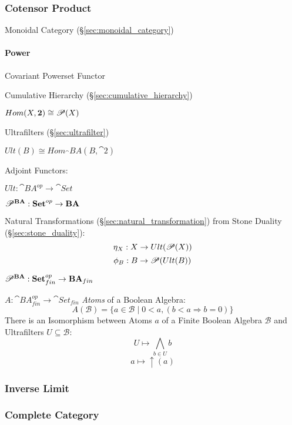 \subsubsection{Cotensor Product}\label{sec:cotensor_product}

Monoidal Category (\S\ref{sec:monoidal_category})



\paragraph{Power}\label{sec:power}

Covariant Powerset Functor %

Cumulative Hierarchy (\S\ref{sec:cumulative_hierarchy})

$Hom(X,\mathbf{2}) \cong \mathscr{P}(X)$

Ultrafilters (\S\ref{sec:ultrafilter})

$Ult(B) \cong Hom_\cat{BA}(B,\cat{2})$

Adjoint Functors:

$Ult : \cat{BA}^{op} \rightarrow \cat{Set}$

$\mathscr{P}^\mathbf{BA} : \mathbf{Set}^{op} \rightarrow \mathbf{BA}$

Natural Transformations (\S\ref{sec:natural_transformation}) from
Stone Duality (\S\ref{sec:stone_duality}):
\[
  \eta_X : X \rightarrow Ult(\mathscr{P}(X))
\]\[
  \phi_B : B \rightarrow \mathscr{P}(Ult(B))
\]

$\mathscr{P}^\mathbf{BA} :
  \mathbf{Set}^{op}_{fin} \rightarrow \mathbf{BA}_{fin}$

$A : \cat{BA}^{op}_{fin} \rightarrow \cat{Set}_{fin}$
\emph{Atoms} of a Boolean Algebra:
\[
  A(\mathcal{B}) = \{ a \in \mathcal{B} \;|\;
    0 < a, (b < a \Rightarrow b = 0) \}
\]
There is an Isomorphism between Atoms $a$ of a Finite Boolean Algebra
$\mathcal{B}$ and Ultrafilters $U \subseteq \mathcal{B}$:
\[
  U \mapsto \bigwedge_{b \in U} b
\]\[
  a \mapsto \uparrow (a)
\]



\subsubsection{Inverse Limit}\label{sec:inverse_limit}

\subsubsection{Complete Category}\label{sec:complete_category}


